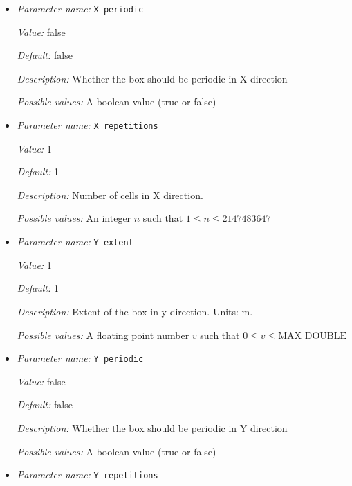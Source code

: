 \begin{itemize}
{\it Default:} 1


{\it Description:} Extent of the box in x-direction. Units: m.


{\it Possible values:} A floating point number $v$ such that $0 \leq v \leq \text{MAX\_DOUBLE}$
\item {\it Parameter name:} {\tt X periodic}
\label{parameters:Geometry model/Box/X periodic}


{\it Value:} false


{\it Default:} false


{\it Description:} Whether the box should be periodic in X direction


{\it Possible values:} A boolean value (true or false)
\item {\it Parameter name:} {\tt X repetitions}
\label{parameters:Geometry model/Box/X repetitions}


{\it Value:} 1


{\it Default:} 1


{\it Description:} Number of cells in X direction.


{\it Possible values:} An integer $n$ such that $1\leq n \leq 2147483647$
\item {\it Parameter name:} {\tt Y extent}
\label{parameters:Geometry model/Box/Y extent}


{\it Value:} 1


{\it Default:} 1


{\it Description:} Extent of the box in y-direction. Units: m.


{\it Possible values:} A floating point number $v$ such that $0 \leq v \leq \text{MAX\_DOUBLE}$
\item {\it Parameter name:} {\tt Y periodic}
\label{parameters:Geometry model/Box/Y periodic}


{\it Value:} false


{\it Default:} false


{\it Description:} Whether the box should be periodic in Y direction


{\it Possible values:} A boolean value (true or false)
\item {\it Parameter name:} {\tt Y repetitions}
\label{parameters:Geometry model/Box/Y repetitions}



\end{itemize}
